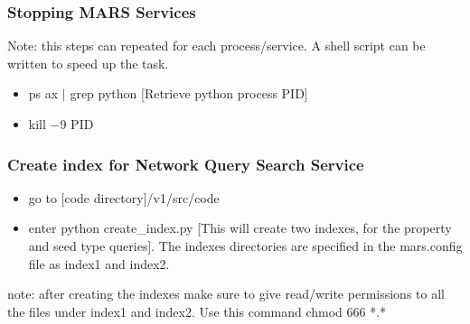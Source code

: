 \subsubsection{Stopping MARS Services}
Note: this steps can repeated for each process/service. A shell script can be written to speed up the task.
\begin{itemize}
\item ps ax $|$ grep python [Retrieve python process PID]
\item kill $-$9 PID

\end{itemize}

\subsubsection{Create index for Network Query Search Service}

\begin{itemize}
\item go to [code directory]/v1/src/code
\item enter python create\_index.py [This will create two indexes, for the property and seed type queries]. The indexes directories are specified in the mars.config file as index1 and index2.
\end{itemize}
note: after creating the indexes make sure to give read/write permissions to all the files under index1 and index2. Use this command chmod 666 *.*




